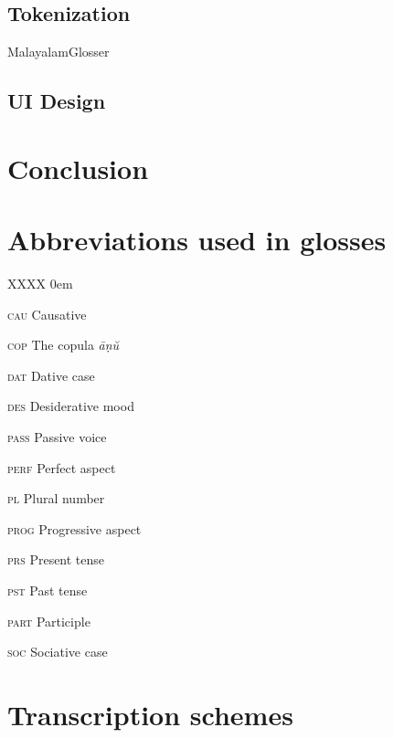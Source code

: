 \documentclass[a4paper]{article}
\begin{document}
\subsection{Tokenization}

MalayalamGlosser

\subsection{UI Design}

\section{Conclusion}

\printbibliography
\clearpage

\appendix

\section{Abbreviations used in glosses}

\begin{multicols}{2}
\begin{labeling}{XXXX}
\itemsep0em
\item [\textsc{cau}] Causative
\item [\textsc{cop}] The copula \textit{āṇŭ}
\item [\textsc{dat}] Dative case
\item [\textsc{des}] Desiderative mood
\item [\textsc{pass}] Passive voice
\item [\textsc{perf}] Perfect aspect
\item [\textsc{pl}] Plural number
\item [\textsc{prog}] Progressive aspect
\item [\textsc{prs}] Present tense
\item [\textsc{pst}] Past tense
\item [\textsc{part}] Participle
\item [\textsc{soc}] Sociative case
\end{labeling}
\end{multicols}

\section{Transcription schemes}
\end{document}
